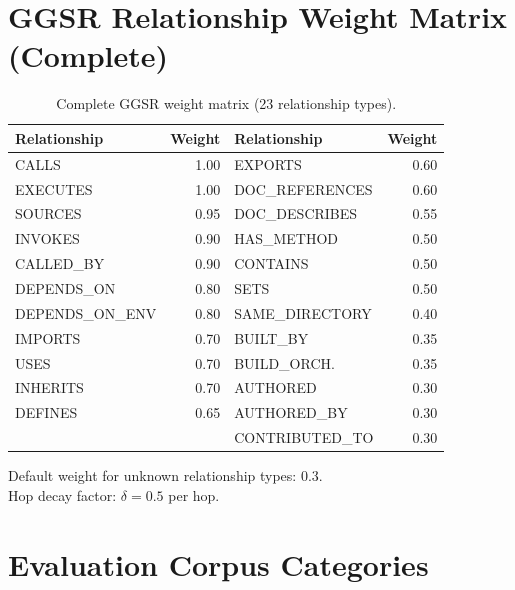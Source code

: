 \documentclass[11pt,letterpaper]{article}
\begin{document}



\newpage
\appendix

\section{GGSR Relationship Weight Matrix (Complete)}
\label{app:weights}

\begin{table}[H]
\centering
\caption{Complete GGSR weight matrix (23 relationship types).}
\small
\begin{tabular}{@{}lr|lr@{}}
\toprule
\textbf{Relationship} & \textbf{Weight} &
\textbf{Relationship} & \textbf{Weight} \\
\midrule
CALLS            & 1.00 & EXPORTS          & 0.60 \\
EXECUTES         & 1.00 & DOC\_REFERENCES  & 0.60 \\
SOURCES          & 0.95 & DOC\_DESCRIBES   & 0.55 \\
INVOKES          & 0.90 & HAS\_METHOD      & 0.50 \\
CALLED\_BY       & 0.90 & CONTAINS         & 0.50 \\
DEPENDS\_ON      & 0.80 & SETS             & 0.50 \\
DEPENDS\_ON\_ENV & 0.80 & SAME\_DIRECTORY  & 0.40 \\
IMPORTS          & 0.70 & BUILT\_BY        & 0.35 \\
USES             & 0.70 & BUILD\_ORCH.     & 0.35 \\
INHERITS         & 0.70 & AUTHORED         & 0.30 \\
DEFINES          & 0.65 & AUTHORED\_BY     & 0.30 \\
                 &      & CONTRIBUTED\_TO  & 0.30 \\
\bottomrule
\end{tabular}
\end{table}

\noindent Default weight for unknown relationship types: $0.3$.\\
Hop decay factor: $\delta = 0.5$ per hop.

\section{Evaluation Corpus Categories}
\label{app:eval}
\end{document}
